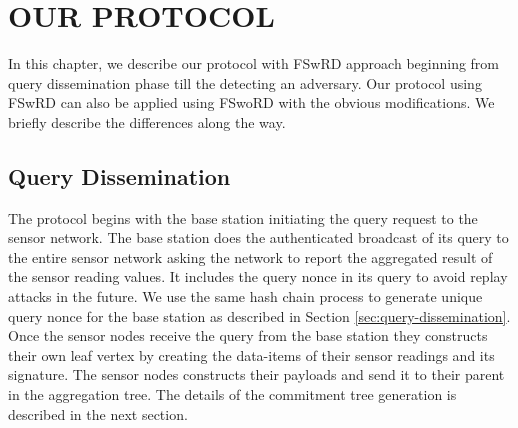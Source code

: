 \chapter{OUR PROTOCOL}
	In this chapter, we describe our protocol with FSwRD approach beginning from query dissemination phase till the detecting an adversary.
	Our protocol using FSwRD can also be applied using FSwoRD with the obvious modifications. 
	We briefly describe the differences along the way.


\section{Query Dissemination}
	The protocol begins with the base station initiating the query request to the sensor network.
	The base station does the authenticated broadcast of its query to the entire sensor network asking the network to report the aggregated result of the sensor reading values.
	It includes the query nonce in its query to avoid replay attacks in the future. 
	We use the same hash chain process to generate unique query nonce for the base station as described in Section \ref{sec:query-dissemination}.
	Once the sensor nodes receive the query from the base station they constructs their own leaf vertex by creating the data-items of their sensor readings and its signature.
	The sensor nodes constructs their payloads and send it to their parent in the aggregation tree. 
	The details of the commitment tree generation is described in the next section.


